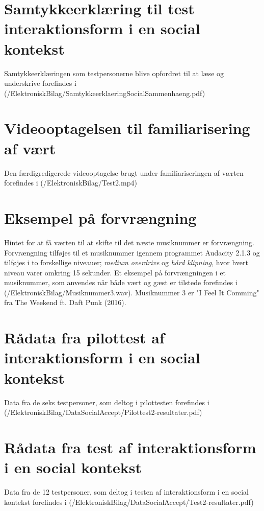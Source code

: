 \section{Samtykkeerklæring til test interaktionsform i en social kontekst}
\label{app:SamtykkeerklaeringSocialAccept}
%
Samtykkeerklæringen som testpersonerne blive opfordret til at læse og underskrive forefindes i (/ElektroniskBilag/SamtykkeerklaeringSocialSammenhaeng.pdf)
%
\section{Videooptagelsen til familiarisering af vært}
\label{app:VideooptagelseFam}
%
Den færdigredigerede videooptagelse brugt under familiariseringen af værten forefindes i (/ElektroniskBilag/Test2.mp4)
%
\section{Eksempel på forvrængning}
\label{app:ForvraengningHint}
%
Hintet for at få værten til at skifte til det næste musiknummer er forvrængning. Forvrængning tilføjes til et musiknummer igennem programmet Audacity 2.1.3 og tilføjes i to forskellige niveauer; \textit{medium overdrive} og \textit{hård klipning}, hvor hvert niveau varer omkring 15 sekunder. Et eksempel på forvrængningen i et musiknummer, som anvendes når både vært og gæst er tilstede forefindes i (/ElektroniskBilag/Musiknummer3.wav). Musiknummer 3 er "I Feel It Comming" fra The Weekend ft. Daft Punk (2016).
%
\section{Rådata fra pilottest af interaktionsform i en social kontekst}
\label{app:ResultaterPilottestSocialAccept}
%
Data fra de seks testpersoner, som deltog i pilottesten forefindes i \\
(/ElektroniskBilag/DataSocialAccept/Pilottest2-resultater.pdf)
%
\section{Rådata fra test af interaktionsform i en social kontekst}
\label{app:ResultaterSocialAccept}
%
Data fra de 12 testpersoner, som deltog i testen af interaktionsform i en social kontekst forefindes i (/ElektroniskBilag/DataSocialAccept/Test2-resultater.pdf)

